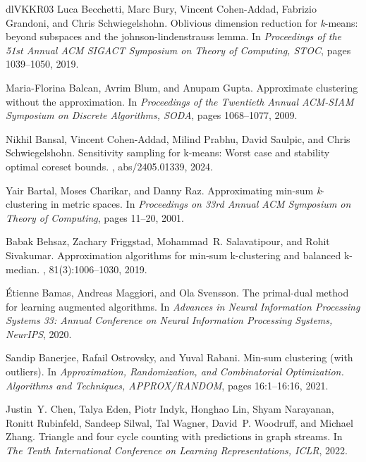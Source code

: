 \documentclass[10pt,a4paper]{amsart}
\begin{document}
\begin{thebibliography}{dlVKKR03}
Luca Becchetti, Marc Bury, Vincent Cohen{-}Addad, Fabrizio Grandoni, and Chris Schwiegelshohn.
\newblock Oblivious dimension reduction for \emph{k}-means: beyond subspaces and the johnson-lindenstrauss lemma.
\newblock In {\em Proceedings of the 51st Annual {ACM} {SIGACT} Symposium on Theory of Computing, {STOC}}, pages 1039--1050, 2019.

Maria{-}Florina Balcan, Avrim Blum, and Anupam Gupta.
\newblock Approximate clustering without the approximation.
\newblock In {\em Proceedings of the Twentieth Annual {ACM-SIAM} Symposium on Discrete Algorithms, {SODA}}, pages 1068--1077, 2009.

Nikhil Bansal, Vincent Cohen{-}Addad, Milind Prabhu, David Saulpic, and Chris Schwiegelshohn.
\newblock Sensitivity sampling for k-means: Worst case and stability optimal coreset bounds.
, abs/2405.01339, 2024.

Yair Bartal, Moses Charikar, and Danny Raz.
\newblock Approximating min-sum \emph{k}-clustering in metric spaces.
\newblock In {\em Proceedings on 33rd Annual {ACM} Symposium on Theory of Computing}, pages 11--20, 2001.

Babak Behsaz, Zachary Friggstad, Mohammad~R. Salavatipour, and Rohit Sivakumar.
\newblock Approximation algorithms for min-sum k-clustering and balanced k-median.
, 81(3):1006--1030, 2019.

{\'{E}}tienne Bamas, Andreas Maggiori, and Ola Svensson.
\newblock The primal-dual method for learning augmented algorithms.
\newblock In {\em Advances in Neural Information Processing Systems 33: Annual Conference on Neural Information Processing Systems, NeurIPS}, 2020.

Sandip Banerjee, Rafail Ostrovsky, and Yuval Rabani.
\newblock Min-sum clustering (with outliers).
\newblock In {\em Approximation, Randomization, and Combinatorial Optimization. Algorithms and Techniques, {APPROX/RANDOM}}, pages 16:1--16:16, 2021.

Justin~Y. Chen, Talya Eden, Piotr Indyk, Honghao Lin, Shyam Narayanan, Ronitt Rubinfeld, Sandeep Silwal, Tal Wagner, David~P. Woodruff, and Michael Zhang.
\newblock Triangle and four cycle counting with predictions in graph streams.
\newblock In {\em The Tenth International Conference on Learning Representations, {ICLR}}, 2022.


\end{thebibliography}
\end{document}
